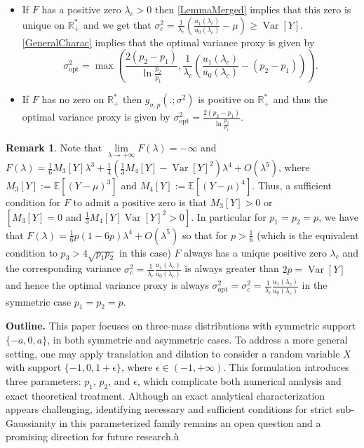 \documentclass[a4paper, 10pt]{article}
\newcommand{\beq}{\begin{equation}}
\newcommand{\eeq}{\end{equation}}
\theoremstyle{definition}
\newtheorem{remark}{Remark}[section]
\begin{document}
\begin{itemize}
    \item If $F$ has a positive zero $\lambda_c>0$ then \autoref{LemmaMerged} implies that this zero is unique on $\mathbb{R}_+^*$ and we get that $\sigma_c^2=\frac{1}{\lambda_c}\left(\frac{u_1(\lambda_c)}{u_0(\lambda_c)}-\mu\right)\geq\operatorname{Var}[Y]$. \autoref{GeneralCharac} implies that the optimal variance proxy is given by
    \beq \sigma_{\mathrm{opt}}^2=\max\left(\frac{2(p_2-p_1)}{\ln \frac{p_2}{p_1}}, \frac{1}{\lambda_c}\left(\frac{u_1(\lambda_c)}{u_0(\lambda_c)}-(p_2-p_1)\right) \right).\eeq
    \item If $F$ has no zero on $\mathbb{R}_+^*$ then $g_{\sigma, p}(.;\sigma^2)$ is positive on $\mathbb{R}_+^*$ and thus the optimal variance proxy is given by $\sigma^2_{\text{opt}}=\frac{2(p_2-p_1)}{\ln \frac{p_2}{p_1}}$.
\end{itemize}

\begin{remark}Note that $\underset{\lambda\to +\infty}{\lim} F(\lambda)=-\infty$ and $F(\lambda)=\frac{1}{6}M_3[Y]\lambda^3+\frac{1}{4}\left(\frac{1}{3}M_4[Y]-\operatorname{Var}[Y]^2\right)\lambda^4+ O(\lambda^5)$, where $M_3[Y]:=\mathbb{E}[(Y-\mu)^3]$ and $M_4[Y]:=\mathbb{E}[(Y-\mu)^4]$. Thus, a sufficient condition for $F$ to admit a positive zero is that $M_3[Y]>0$ or $\left[M_3[Y]=0 \text{ and } \frac{1}{3}M_4[Y]\operatorname{Var}[Y]^2>0\right]$. In particular for $p_1=p_2=p$, we have that $F(\lambda)=\frac{1}{6}p(1-6p)\lambda^4+O(\lambda^5)$ so that for $p>\frac{1}{6}$ (which is the equivalent condition to $p_3>4\sqrt{p_1p_2}$ in this case) $F$ always has a unique positive zero $\lambda_c$ and the corresponding variance $\sigma_c^2=\frac{1}{\lambda_c}\frac{u_1(\lambda_c)}{u_0(\lambda_c)}$ is always greater than $2p=\operatorname{Var}[Y]$ and hence the optimal variance proxy is always $\sigma_{\mathrm{opt}}^2=\sigma_c^2=\frac{1}{\lambda_c}\frac{u_1(\lambda_c)}{u_0(\lambda_c)}$ in the symmetric case $p_1=p_2=p$.
\end{remark}

{\textbf{Outline.}} This paper focuses on three-mass distributions with symmetric support $\{-a, 0, a\}$, in both symmetric and asymmetric cases. To address a more general setting, one may apply translation and dilation to consider a random variable $X$ with support $\{-1, 0, 1+\epsilon\}$, where $\epsilon \in (-1, +\infty)$. This formulation introduces three parameters: $p_1$, $p_2$, and $\epsilon$, which complicate both numerical analysis and exact theoretical treatment. Although an exact analytical characterization appears challenging, identifying necessary and sufficient conditions for strict sub-Gaussianity in this parameterized family remains an open question and a promising direction for future research.ù
\end{document}
